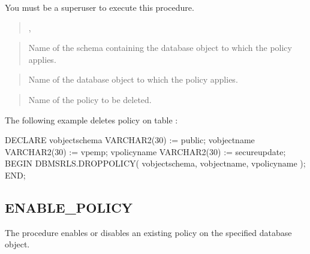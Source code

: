 \documentclass[letterpaper,10pt,english,openany,oneside]{sphinxmanual}
\begin{document}
You must be a superuser to execute this procedure.
\begin{quote}

,

\end{quote}


\begin{quote}

Name of the schema containing the database object to which the policy
applies.
\end{quote}

\begin{quote}

Name of the database object to which the policy applies.
\end{quote}

\begin{quote}

Name of the policy to be deleted.
\end{quote}


The following example deletes policy  on table
:

%
\begin{sphinxVerbatim}[commandchars=\\\{\}]
DECLARE
    v\PYGZus{}object\PYGZus{}schema         VARCHAR2(30) := \PYGZsq{}public\PYGZsq{};
    v\PYGZus{}object\PYGZus{}name           VARCHAR2(30) := \PYGZsq{}vpemp\PYGZsq{};
    v\PYGZus{}policy\PYGZus{}name           VARCHAR2(30) := \PYGZsq{}secure\PYGZus{}update\PYGZsq{};
BEGIN
    DBMS\PYGZus{}RLS.DROP\PYGZus{}POLICY(
        v\PYGZus{}object\PYGZus{}schema,
        v\PYGZus{}object\PYGZus{}name,
        v\PYGZus{}policy\PYGZus{}name
    );
END;
\end{sphinxVerbatim}

\newpage

\ignorespaces 

\subsection{ENABLE\_POLICY}
\label{\detokenize{dbms_rls:index-3}}\label{\detokenize{dbms_rls:enable-policy}}
The  procedure enables or disables an existing policy on
the specified database object.
\end{document}
